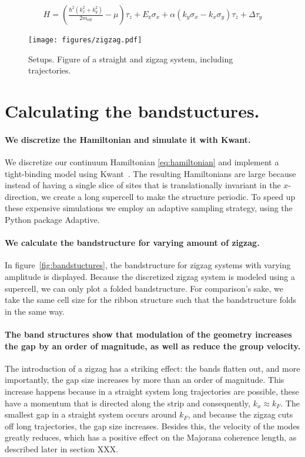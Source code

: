 \documentclass[english, twocolumn, 10pt, aps, superscriptaddress, floatfix, prb, citeautoscript]{revtex4-1}
\newcommand{\kx}{k_x}
\newcommand{\ky}{k_y}
\newcommand{\meff}{m_\text{eff}}
\renewcommand{\comment}[2]{#2}
\renewcommand{\comment}{\paragraph}
\begin{document}
\begin{small}
\begin{align}
    H = \left(\frac{\hbar^2\left(\kx^2 + \ky^2\right)}{2\meff} - \mu\right)\tau_z+
        E_\text{z} \sigma_x+
        \alpha \left( \ky \sigma_x - \kx \sigma_y \right) \tau_z +
        \Delta \tau_y
\end{align}
\label{eq:hamiltonian}
\end{small}

\begin{figure}[!htb]
\texttt{[image: figures/zigzag.pdf]}
\caption{Setups. Figure of a straight and zigzag system, including trajectories.
\label{fig:setup}}
\end{figure}

\section{Calculating the bandstuctures.}

\comment{We discretize the Hamiltonian and simulate it with Kwant.}
We discretize our continuum Hamiltonian \eqref{eq:hamiltonian} and implement a tight-binding model using Kwant~\cite{groth_kwant:_2014}.
The resulting Hamiltonians are large because instead of having a single slice of sites that is translationally invariant in the $x$-direction, we create a long supercell to make the structure periodic.
To speed up these expensive simulations we employ an adaptive sampling strategy, using the Python package Adaptive. %

\comment{We calculate the bandstructure for varying amount of zigzag.}
In figure~\ref{fig:bandstuctures}, the bandstructure for zigzag systems with varying amplitude is displayed.
Because the discretized zigzag system is modeled using a supercell, we can only plot a folded bandstructure.
For comparison's sake, we take the same cell size for the ribbon structure such that the bandstructure folds in the same way.

\comment{The band structures show that modulation of the geometry increases the gap by an order of magnitude, as well as reduce the group velocity.}
The introduction of a zigzag has a striking effect: the bands flatten out, and more importantly, the gap size increases by more than an order of magnitude.
This increase happens because in a straight system long trajectories are possible, these have a momentum that is directed along the strip and consequently, $k_x \approx k_F$.
The smallest gap in a straight system occurs around $k_F$, and because the zigzag cuts off long trajectories, the gap size increases. 
Besides this, the velocity of the modes greatly reduces, which has a positive effect on the Majorana coherence length, as described later in section XXX. %
\end{document}
